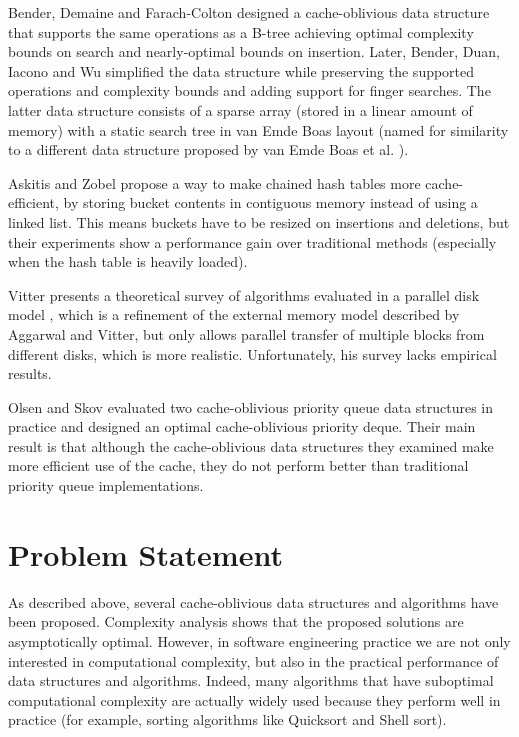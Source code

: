 \documentclass{acm_proc_article-sp}
\begin{document}
Bender, Demaine and Farach-Colton designed a cache-oblivious data structure that supports the same operations as a B-tree \cite{bender2005cob} achieving optimal complexity bounds on search and nearly-optimal bounds on insertion. Later, Bender, Duan, Iacono and Wu simplified the data structure \cite{bender2004lpc} while preserving the supported operations and complexity bounds and adding support for finger searches. The latter data structure consists of a sparse array (stored in a linear amount of memory) with a static search tree in van Emde Boas layout (named for similarity to a different data structure proposed by van Emde Boas et al. \cite{vanemdeboas1976dai}).

Askitis and Zobel \cite{askitis2005ccc} propose a way to make chained hash tables more cache-efficient, by storing bucket contents in contiguous memory instead of using a linked list. This means buckets have to be resized on insertions and deletions, but their experiments show a performance gain over traditional methods (especially when the hash table is heavily loaded).

Vitter presents a theoretical survey of algorithms evaluated in a parallel disk model \cite{vitter2001ema}, which is a refinement of the external memory model described by Aggarwal and Vitter, but only allows parallel transfer of multiple blocks from different disks, which is more realistic. Unfortunately, his survey lacks empirical results.

Olsen and Skov evaluated two cache-oblivious priority queue data structures in practice \cite{olsen2002coa} and designed an optimal cache-obli\-vious priority deque. Their main result is that although the cache-obli\-vious data structures they examined make more efficient use of the cache, they do not perform better than traditional priority queue implementations.

\section{Problem Statement}
As described above, several cache-oblivious data structures and algorithms have been proposed. Complexity analysis shows that the proposed solutions are asymptotically optimal. However, in software engineering practice we are not only interested in computational complexity, but also in the practical performance of data structures and algorithms. Indeed, many algorithms that have suboptimal computational complexity are actually widely used because they perform well in practice (for example, sorting algorithms like Quicksort and Shell sort).
\end{document}
